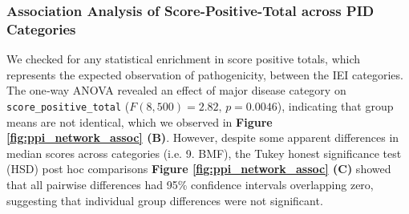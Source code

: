 \FloatBarrier
\subsubsection{Association Analysis of Score-Positive-Total across PID Categories} 

We checked for any statistical enrichment in score positive totals, which represents the expected observation of pathogenicity, between the IEI categories.
The one‐way ANOVA revealed an effect of major disease category on \texttt{score\_positive\_total} (\(F(8,500)=2.82,\,p=0.0046\)), indicating that group means are not identical, which we observed in
\textbf{Figure \ref{fig:ppi_network_assoc} (B)}.
However, despite some apparent differences in median scores across categories (i.e. 9. BMF), the Tukey honest significance test (HSD) post hoc comparisons 
\textbf{Figure \ref{fig:ppi_network_assoc} (C)}
showed that all pairwise differences had 95\% confidence intervals overlapping zero, suggesting that individual group differences were not significant.

\FloatBarrier
%
%

